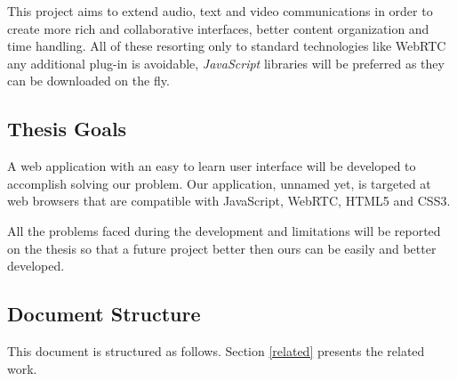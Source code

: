 	This project aims to extend audio, text and video communications in order to create more rich and collaborative interfaces, better content organization and time handling. All of these resorting only to standard technologies like \ac{WebRTC} any additional plug-in is avoidable, \emph{JavaScript} libraries will be preferred as they can be downloaded on the fly.  

        
\subsection{Thesis Goals} %

A web application with an easy to learn user interface will be developed to accomplish solving our problem. Our application, unnamed yet, is targeted at web browsers that are compatible with JavaScript, \ac{WebRTC}, \ac{HTML}5 and \ac{CSS}3.

	All the problems faced during the development and limitations will be reported on the thesis so that a future project better then ours can be easily and better developed.

\subsection{Document Structure} %
This document is structured as follows. Section \ref{related} presents the related work.

